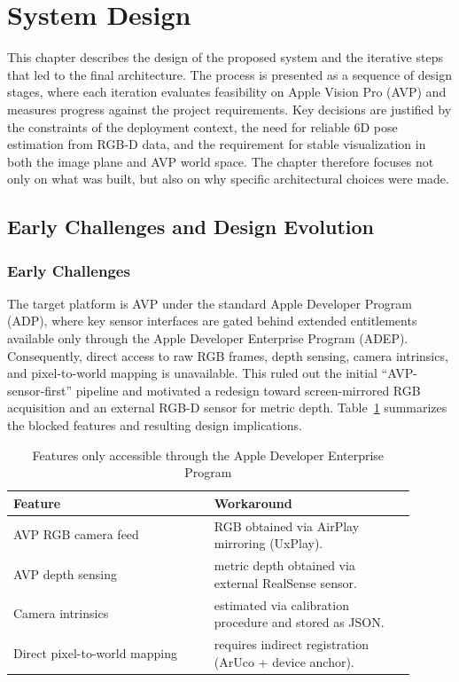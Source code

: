 \section{System Design}
This chapter describes the design of the proposed system and the iterative steps that led to the final architecture. The process is presented as a sequence of design stages, where each iteration evaluates feasibility on Apple Vision Pro (AVP) and measures progress against the project requirements. Key decisions are justified by the constraints of the deployment context, the need for reliable 6D pose estimation from RGB-D data, and the requirement for stable visualization in both the image plane and AVP world space. The chapter therefore focuses not only on what was built, but also on why specific architectural choices were made.

\subsection{Early Challenges and Design Evolution}

\subsubsection{Early Challenges}
The target platform is AVP under the standard Apple Developer Program (ADP), where key sensor interfaces are gated behind extended entitlements available only through the Apple Developer Enterprise Program (ADEP). Consequently, direct access to raw RGB frames, depth sensing, camera intrinsics, and pixel-to-world mapping is unavailable. This ruled out the initial ``AVP-sensor-first'' pipeline and motivated a redesign toward screen-mirrored RGB acquisition and an external RGB-D sensor for metric depth. Table~\ref{tab:adep_blocked} summarizes the blocked features and resulting design implications.

\begin{table}[H]
    \centering
    \caption{Features only accessible through the Apple Developer Enterprise Program}
    \label{tab:adep_blocked}
    \begin{tabular}{p{0.45\linewidth}p{0.45\linewidth}}
        \toprule
        \textbf{Feature} & \textbf{Workaround} \\
        \midrule
        AVP RGB camera feed & RGB obtained via AirPlay mirroring (UxPlay). \\
        AVP depth sensing & metric depth obtained via external RealSense sensor. \\
        Camera intrinsics & estimated via calibration procedure and stored as JSON. \\
        Direct pixel-to-world mapping & requires indirect registration (ArUco + device anchor). \\
        \bottomrule
    \end{tabular}
\end{table}
